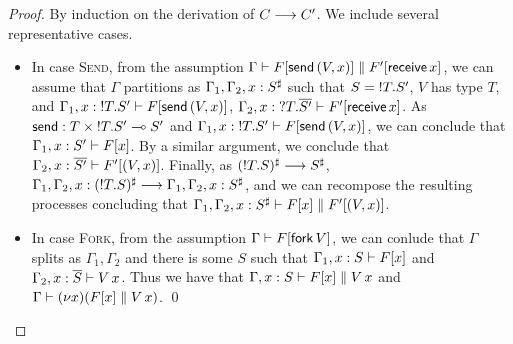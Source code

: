 \documentclass[orivec,envcountsame]{llncs}
\begin{document}
\begin{proof}
  By induction on the derivation of $C \longrightarrow C'$.  We include several representative cases.
  \begin{itemize}
  \item In case \textsc{Send}, from the assumption $\Gamma \vdash F[\mathsf{send}\,(V,x)] \parallel
    F'[\mathsf{receive} \, x]$, we can assume that $\Gamma$ partitions as
    $\Gamma_1,\Gamma_2,x:S^\sharp$ such that $S = {!T.S'}$, $V$ has type $T$, and
    $\Gamma_1,x:{!T.S'} \vdash F[\mathsf{send} \, (V,x)]$,
    $\Gamma_2,x:{?T.\overline{S'}} \vdash F'[\mathsf{receive} \, x]$.  As $\mathsf{send} : T
    \times {!T.S'} \multimap S'$ and $\Gamma_1,x:{!T.S'} \vdash F[\mathsf{send} \,
    (V,x)]$, we can conclude that $\Gamma_1,x:S' \vdash F[x]$.  By a similar argument, we conclude
    that $\Gamma_2,x:\overline{S'} \vdash F'[(V,x)]$. Finally, as $({!T.S})^\sharp \longrightarrow
    S^\sharp$, $\Gamma_1,\Gamma_2,x:({!T.S})^\sharp \longrightarrow
    \Gamma_1,\Gamma_2,x:S^\sharp$, and we can recompose the resulting processes concluding that
    $\Gamma_1,\Gamma_2,x:S^\sharp \vdash F[x] \parallel F'[(V,x)]$.
  \item In case \textsc{Fork}, from the assumption $\Gamma \vdash F[\mathsf{fork} \, V]$, we
    can conlude that $\Gamma$ splits as $\Gamma_1,\Gamma_2$ and there is some $S$ such that
    $\Gamma_1,x:S \vdash F[x]$ and $\Gamma_2,x:\overline{S} \vdash V \, x$.  Thus we have that
    $\Gamma,x:S \vdash F[x] \parallel V \, x$ and $\Gamma \vdash (\nu x)(F[x] \parallel V \,
    x)$.
    \qed
  \end{itemize}
\end{proof}
\end{document}
